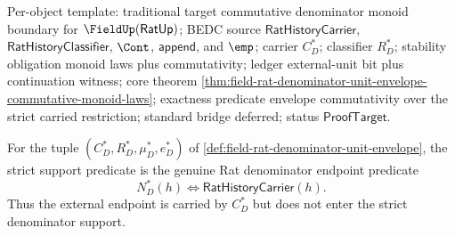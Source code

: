 Per-object template: traditional target commutative denominator monoid boundary
for $\FieldUp(\mathsf{RatUp})$; BEDC source $\mathsf{RatHistoryCarrier}$,
$\mathsf{RatHistoryClassifier}$, $\Cont$, $\mathsf{append}$, and $\emp$;
carrier $C_D^\ast$; classifier $R_D^\ast$; stability obligation monoid laws
plus commutativity; ledger external-unit bit plus continuation witness; core
theorem
\autoref{thm:field-rat-denominator-unit-envelope-commutative-monoid-laws};
exactness predicate envelope commutativity over the strict carried restriction;
standard bridge deferred; status $\mathsf{ProofTarget}$.

\begin{definition}
\label{def:field-rat-denominator-unit-envelope-strict-support}
For the tuple $(C_D^\ast,R_D^\ast,\mu_D^\ast,e_D^\ast)$ of
\autoref{def:field-rat-denominator-unit-envelope}, the strict support
predicate is the genuine Rat denominator endpoint predicate
$$
N_D^\ast(h)\Longleftrightarrow\mathsf{RatHistoryCarrier}(h).
$$
Thus the external endpoint is carried by $C_D^\ast$ but does not enter the
strict denominator support.
\end{definition}


